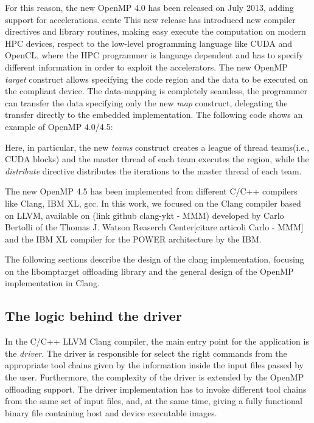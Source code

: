 For this reason, the new OpenMP 4.0 has been released on July 2013, adding support for accelerations. cente
This new release has introduced new compiler directives and library routines, making easy execute the computation on modern HPC devices, respect to the low-level programming language like CUDA and OpenCL, where the HPC programmer is language dependent and has to specify different information in order to exploit the accelerators. The new OpenMP \emph{target} construct allows specifying the code region and the data to be executed on the compliant device. The data-mapping is completely seamless, the programmer can transfer the data specifying only the new \emph{map} construct, delegating the transfer directly to the embedded implementation. The following code shows an example of OpenMP 4.0/4.5:



Here, in particular, the new \emph{teams} construct creates a league of thread teams(i.e., CUDA blocks) and the master thread of each team executes the region, while the\emph{ distribute}
directive distributes the iterations to the master thread of each team.

The new OpenMP 4.5 has been implemented from different C/C++ compilers like Clang, IBM XL, gcc. In this work, we focused on the Clang compiler based on LLVM, available on (link github clang-ykt - MMM) developed by Carlo Bertolli of the Thomas J. Watson Reaserch Center[citare articoli Carlo - MMM] and the IBM XL compiler for the POWER architecture by the IBM.

The following sections describe the design of the clang implementation, focusing on the libomptarget offloading library and the general design of the OpenMP implementation in Clang.




\subsection{The logic behind the driver}

In the C/C++ LLVM Clang compiler, the main entry point for the application is the \emph{driver}. The driver is responsible for select the right commands from the appropriate tool chains given by the information inside the input files passed by the user. Furthermore, the complexity of the driver is extended by the OpenMP offloading support. The driver implementation has to invoke different tool chains from the same set of input files, and, at the same time, giving a fully functional binary file containing host and device executable images.

